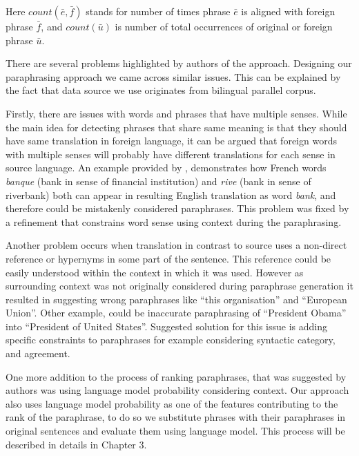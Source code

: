 \begin{center}
\textit{\cite{Callison-Burch2007}}
\end{center}

Here $count(\bar{e}, \bar{f})$ stands for number of times phrase $\bar{e}$ is aligned with foreign phrase $\bar{f}$, and $count(\bar{u})$ is number of total occurrences of original or foreign phrase $\bar{u}$. 

There are several problems highlighted by authors of the approach. Designing our paraphrasing approach we came across similar issues. This can be explained by the fact that data source we use originates from bilingual parallel corpus.  

Firstly, there are issues with words and phrases that have multiple senses. While the main idea for detecting phrases that share same meaning is that they should have same translation in foreign language, it can be argued that foreign words with multiple senses will probably have different translations for each sense in source language. An example provided by \cite{Callison-Burch2007}, demonstrates how French words \textit{banque} (bank in sense of financial institution) and \textit{rive} (bank in sense of riverbank) both can appear in resulting English translation as word \textit{bank}, and therefore could be mistakenly considered paraphrases. This problem was fixed by a refinement that constrains word sense using context during the paraphrasing. 

Another problem occurs when translation in contrast to source uses a non-direct reference or hypernyms in some part of the sentence. This reference could be easily understood within the context in which it was used. However as surrounding context was not originally considered during paraphrase generation it resulted in suggesting wrong paraphrases like ``this organisation'' and ``European Union''. Other example, could be inaccurate paraphrasing of ``President Obama'' into ``President of United States''. Suggested solution for this issue is adding specific constraints to paraphrases for example considering syntactic category, and agreement.

One more addition to the process of ranking paraphrases, that was suggested by authors was using language model probability considering context. Our approach also uses language model probability as one of the features contributing to the rank of the paraphrase, to do so we substitute phrases with their paraphrases in original sentences and evaluate them using language model. This process will be described in details in Chapter 3.

